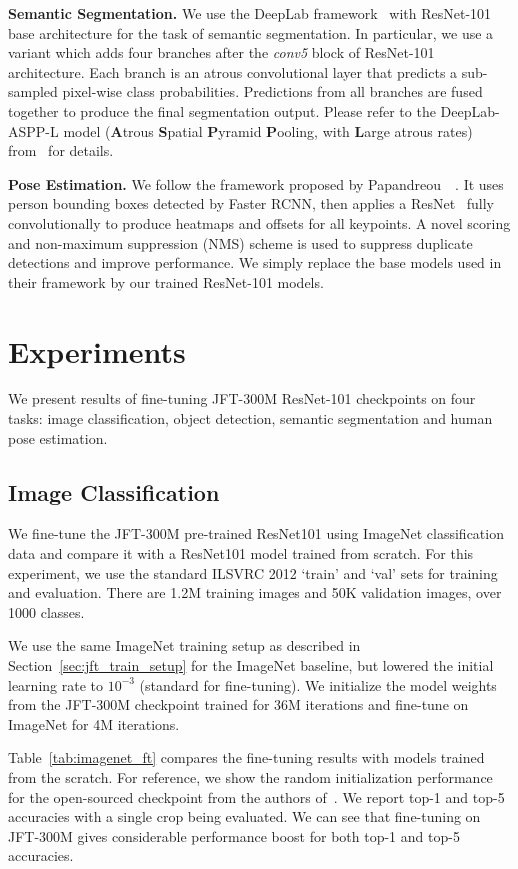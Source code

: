 \documentclass[10pt,twocolumn,letterpaper]{article}
\begin{document}
\noindent\textbf{Semantic Segmentation.} We use the DeepLab framework~\cite{chen2016deeplab} with ResNet-101 base architecture for the task of semantic segmentation. In particular, we use a variant which adds four branches after the \textit{conv5} block of ResNet-101 architecture. Each branch is an atrous convolutional layer that predicts a sub-sampled pixel-wise class probabilities. Predictions from all branches are fused together to produce the final segmentation output. Please refer to the DeepLab-ASPP-L model (\textbf{A}trous \textbf{S}patial \textbf{P}yramid \textbf{P}ooling, with \textbf{L}arge atrous rates) from~\cite{chen2016deeplab} for details.


\noindent\textbf{Pose Estimation.}
We follow the framework proposed by Papandreou~\etal~\cite{papandreou2017towards}. It uses person bounding boxes detected by Faster RCNN, then applies a ResNet~\cite{he2016resnet} fully convolutionally to produce heatmaps and offsets for all keypoints. A novel scoring and non-maximum suppression (NMS) scheme is used to suppress duplicate detections and improve performance. We simply replace the base models used in their framework by our trained ResNet-101 models.

\section{Experiments}
\label{sec:exp}
We present results of fine-tuning JFT-300M ResNet-101 checkpoints on four tasks: image classification, object detection, semantic segmentation and human pose estimation.

\subsection{Image Classification}
We fine-tune the JFT-300M pre-trained ResNet101 using ImageNet classification data and compare it with a ResNet101 model trained from scratch. For this experiment, we use the standard ILSVRC 2012 `train' and `val' sets for training and evaluation. There are 1.2M training images and 50K validation images, over 1000 classes.

We use the same ImageNet training setup as described in Section~\ref{sec:jft_train_setup} for the ImageNet baseline,
but lowered the initial learning rate to $10^{-3}$ (standard for fine-tuning). We initialize the model weights from the JFT-300M checkpoint trained for 36M iterations and fine-tune on ImageNet for 4M iterations.

Table~\ref{tab:imagenet_ft} compares the fine-tuning results with models trained from the scratch. For reference, we show the random initialization performance for the open-sourced checkpoint from the authors of~\cite{he2016resnet}. We report top-1 and top-5 accuracies with a single crop being evaluated. We can see that fine-tuning
on JFT-300M gives considerable performance boost for both top-1 and top-5 accuracies. 
\end{document}
